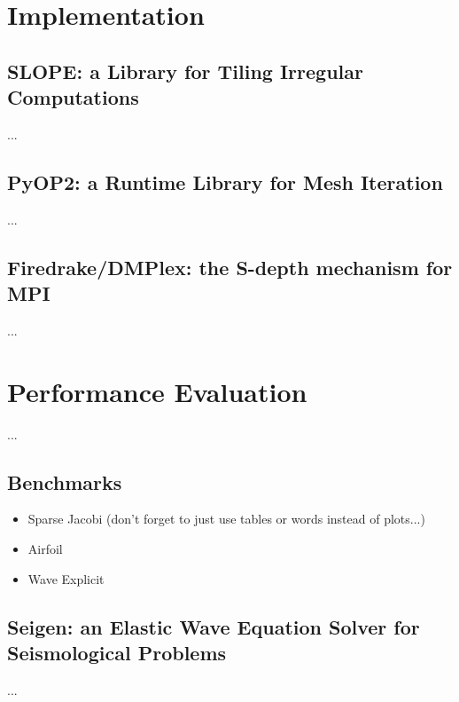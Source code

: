 
\section{Implementation}
\label{sec:tiling:automation}

\subsection{SLOPE: a Library for Tiling Irregular Computations}
...

\subsection{PyOP2: a Runtime Library for Mesh Iteration}
...

\subsection{Firedrake/DMPlex: the S-depth mechanism for MPI}
...


\section{Performance Evaluation}
...

\subsection{Benchmarks}
\begin{itemize}
\item Sparse Jacobi (don't forget to just use tables or words instead of plots...)
\item Airfoil
\item Wave Explicit
\end{itemize}

\subsection{Seigen: an Elastic Wave Equation Solver for Seismological Problems}
\label{sec:tiling:seigen}
...
